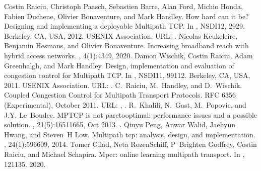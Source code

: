 \documentclass[letterpaper,10pt,english]{sphinxmanual}
\begin{document}
\begin{sphinxthebibliography}{10}
\sphinxAtStartPar
Costin Raiciu, Christoph Paasch, Sebastien Barre, Alan Ford, Michio Honda, Fabien Duchene, Olivier Bonaventure, and Mark Handley. How hard can it be? Designing and implementing a deployable Multipath TCP. In , NSDI\textquotesingle{}12, 29\textendash{}29. Berkeley, CA, USA, 2012. USENIX Association. URL: .
\sphinxAtStartPar
Nicolas Keukeleire, Benjamin Hesmans, and Olivier Bonaventure. Increasing broadband reach with hybrid access networks. , 4(1):43\textendash{}49, 2020.
\sphinxAtStartPar
Damon Wischik, Costin Raiciu, Adam Greenhalgh, and Mark Handley. Design, implementation and evaluation of congestion control for Multipath TCP. In , NSDI\textquotesingle{}11, 99\textendash{}112. Berkeley, CA, USA, 2011. USENIX Association. URL: .
\sphinxAtStartPar
C. Raiciu, M. Handley, and D. Wischik. Coupled Congestion Control for Multipath Transport Protocols. RFC 6356 (Experimental), October 2011. URL: , .
\sphinxAtStartPar
R. Khalili, N. Gast, M. Popovic, and J.\sphinxhyphen{}Y. Le Boudec. MPTCP is not pareto\sphinxhyphen{}optimal: performance issues and a possible solution. , 21(5):1651\textendash{}1665, Oct 2013. .
\sphinxAtStartPar
Qiuyu Peng, Anwar Walid, Jaehyun Hwang, and Steven H Low. Multipath tcp: analysis, design, and implementation. , 24(1):596\textendash{}609, 2014.
\sphinxAtStartPar
Tomer Gilad, Neta Rozen\sphinxhyphen{}Schiff, P Brighten Godfrey, Costin Raiciu, and Michael Schapira. Mpcc: online learning multipath transport. In , 121\textendash{}135. 2020.

\end{sphinxthebibliography}
\end{document}
